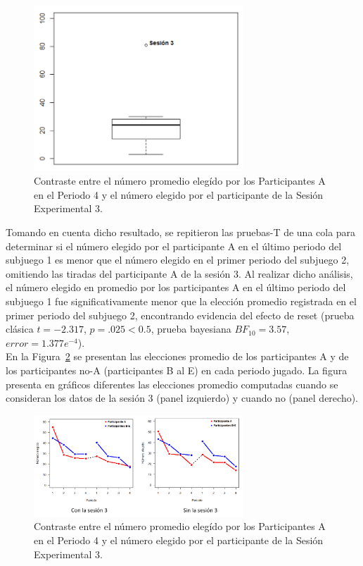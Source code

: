 \begin{figure}[th]
\centering
\includegraphics[width=0.70\textwidth]{Figures/Fig_7} 
\caption[Contraste de caso atípico en el número elegido en el periodo 4 de la Sesión experimental 3]{Contraste entre el número promedio elegído por los Participantes A en el Periodo 4 y el número elegido por el participante de la Sesión Experimental 3.}
\label{fig:Participante_Atipico}
\end{figure}

Tomando en cuenta dicho resultado, se repitieron las pruebas-T de una cola para determinar si el número elegido por el participante A en el último periodo del subjuego 1 es menor que el número elegido en el primer periodo del subjuego 2, omitiendo las tiradas del participante A de la sesión 3. Al realizar dicho análisis, el número elegido en promedio por los participantes A en el último periodo del subjuego 1 fue significativamente menor que la elección promedio registrada en el primer periodo del subjuego 2, encontrando evidencia del efecto de reset (prueba clásica $t = -2.317$, $p = .025 < 0.5$, prueba bayesiana $BF_{10} = 3.57$, $error = 1.377e^{-4}$).\\

En la Figura~\ref{fig:Promedio_ConSin3} se presentan las elecciones promedio de los participantes A y de los participantes no-A (participantes B al E) en cada periodo jugado. La figura presenta en gráficos diferentes las elecciones promedio computadas cuando se consideran los datos de la sesión 3 (panel izquierdo) y cuando no (panel derecho).\\

\begin{figure}[th]
\centering
\includegraphics[width=0.70\textwidth]{Figures/Fig_8} 
\caption[Cambio en el número elegido periodo a periodo.]{Contraste entre el número promedio elegído por los Participantes A en el Periodo 4 y el número elegido por el participante de la Sesión Experimental 3.}
\label{fig:Promedio_ConSin3}
\end{figure}

